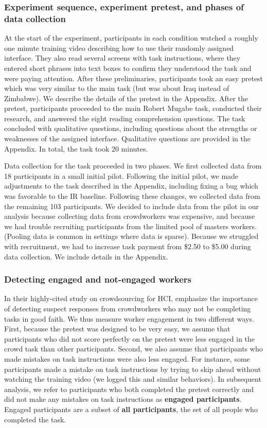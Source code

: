 \subsubsection{Experiment sequence, experiment pretest, and phases of data collection}

At the start of the experiment, participants in each condition watched a roughly one minute training video describing how to use their randomly assigned interface.
They also read several screens with task instructions, where they entered short phrases into text boxes to confirm they understood the task and were paying attention.
After these preliminaries, participants took an easy pretest which was very similar to the main task (but was about Iraq instead of Zimbabwe).
We describe the details of the pretest in the Appendix.
After the pretest, participants proceeded to the main Robert Mugabe task, conducted their research, and answered the eight reading comprehension questions.
The task concluded with qualitative questions, including questions about the strengths or weaknesses of the assigned interface. 
Qualitative questions are provided in the Appendix.
In total, the task took 20 minutes.

Data collection for the task proceeded in two phases. We first collected data from 18 participants in a small initial pilot. Following the initial pilot, we made adjustments to the task described in the Appendix, including fixing a bug which was favorable to the IR baseline. Following these changes, we collected data from the remaining 103 participants. We decided to include data from the pilot in our analysis because collecting data from crowdworkers was expensive, and because we had trouble recruiting participants from the limited pool of masters workers. (Pooling data is common in settings where data is sparse).
Because we struggled with recruitment, we had to increase task payment from \$2.50 to \$5.00 during data collection. 
We include details in the Appendix. 

\subsubsection{Detecting engaged and not-engaged workers}

In their highly-cited study on crowdsourcing for HCI, \citet{Kittur} emphasize the importance of detecting suspect responses from crowdworkers who may not be completing tasks in good faith.
We thus measure worker engagement in two different ways.
First, because the pretest was designed to be very easy, we assume that participants who did not score perfectly on the pretest were less engaged in the crowd task than other participants.
Second, we also assume that participants who made mistakes on task instructions were also less engaged.  
For instance, some participants made a mistake on task instructions by trying to skip ahead without watching the training video (we logged this and similar behaviors).
In subsequent analysis, we refer to participants who both completed the pretest correctly and did not make any mistakes on task instructions as \textbf{engaged participants}.
Engaged participants are a subset of \textbf{all participants}, the set of all people who completed the task.

